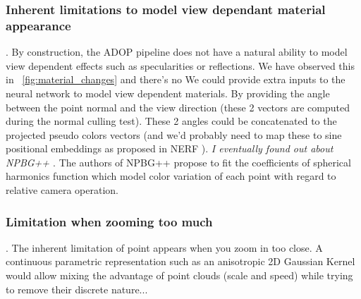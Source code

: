 \subsubsection*{Inherent limitations to model view dependant material appearance}.
By construction, the ADOP pipeline does not have a natural ability to model view dependent effects such as specularities or reflections. We have observed this in ~\cref{fig:material_changes} and there's no  
We could provide extra inputs to the neural network to model view dependent materials. By providing the angle between the point normal and the view direction (these 2 vectors are computed during the normal culling test). These 2 angles could be concatenated to the projected pseudo colors vectors (and we'd probably need to map these to sine positional embeddings as proposed in NERF  \cite{mildenhall2020nerf}). \textit{I eventually found out about NPBG++ \cite{rakhimov2022npbg}}. The authors of NPBG++ propose to fit the coefficients of spherical harmonics function which model color variation of each point with regard to relative camera operation.

\subsubsection*{Limitation when zooming too much}.
The inherent limitation of point appears when you zoom in too close. A continuous parametric representation \cite{kerbl3Dgaussians} such as an anisotropic 2D Gaussian Kernel would allow mixing the advantage of point clouds (scale and speed) while trying to remove their discrete nature... 
